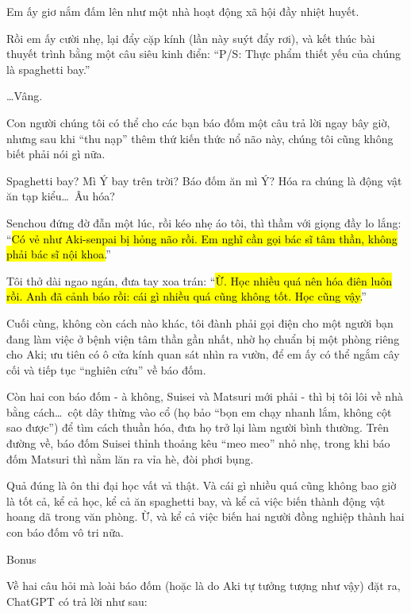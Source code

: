 \documentclass[../main.tex]{subfiles}
\begin{document}
Em ấy giơ nắm đấm lên như một nhà hoạt động xã hội đầy nhiệt huyết.

Rồi em ấy cười nhẹ, lại đẩy cặp kính (lần này suýt đẩy rơi), và kết thúc bài thuyết trình bằng một câu siêu kinh điển: ``P/S: Thực phẩm thiết yếu của chúng là spaghetti bay.''

\dots Vâng.

Con người chúng tôi có thể cho các bạn báo đốm một câu trả lời ngay bây giờ, nhưng sau khi ``thu nạp'' thêm thứ kiến thức nổ não này, chúng tôi cũng không biết phải nói gì nữa.

Spaghetti bay? Mì Ý bay trên trời? Báo đốm ăn mì Ý? Hóa ra chúng là động vật ăn tạp kiểu\dots\ Âu hóa?

Senchou đứng đờ đẫn một lúc, rồi kéo nhẹ áo tôi, thì thầm với giọng đầy lo lắng: ``\hl{Có vẻ như Aki-senpai bị hỏng não rồi. Em nghĩ cần gọi bác sĩ tâm thần, không phải bác sĩ nội khoa.}''

Tôi thở dài ngao ngán, đưa tay xoa trán: ``\hl{Ừ. Học nhiều quá nên hóa điên luôn rồi. Anh đã cảnh báo rồi: cái gì nhiều quá cũng không tốt. Học cũng vậy.}''

Cuối cùng, không còn cách nào khác, tôi đành phải gọi điện cho một người bạn đang làm việc ở bệnh viện tâm thần gần nhất, nhờ họ chuẩn bị một phòng riêng cho Aki; ưu tiên có ô cửa kính quan sát nhìn ra vườn, để em ấy có thể ngắm cây cối và tiếp tục ``nghiên cứu'' về báo đốm.

Còn hai con báo đốm - à không, Suisei và Matsuri mới phải - thì bị tôi lôi về nhà bằng cách\dots\ cột dây thừng vào cổ (họ bảo ``bọn em chạy nhanh lắm, không cột sao được'') để tìm cách thuần hóa, đưa họ trở lại làm người bình thường. Trên đường về, báo đốm Suisei thỉnh thoảng kêu ``meo meo'' nhỏ nhẹ, trong khi báo đốm Matsuri thì nằm lăn ra vỉa hè, đòi phơi bụng.

Quả đúng là ôn thi đại học vất vả thật. Và cái gì nhiều quá cũng không bao giờ là tốt cả, kể cả học, kể cả ăn spaghetti bay, và kể cả việc biến thành động vật hoang dã trong văn phòng. Ừ, và kể cả việc biến hai người đồng nghiệp thành hai con báo đốm vô tri nữa.

\begin{center}{\abv\Large Bonus}\end{center}

Về hai câu hỏi mà loài báo đốm (hoặc là do Aki tự tưởng tượng như vậy) đặt ra, ChatGPT có trả lời như sau:


\end{document}

